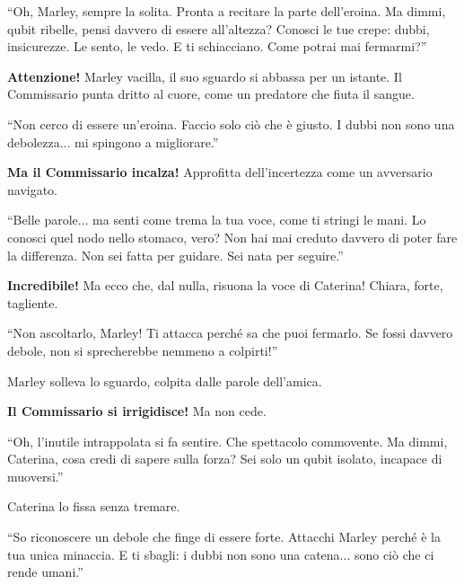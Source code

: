 \begin{dialogue}  \enquote{Oh, Marley, sempre la solita. Pronta a recitare la parte dell’eroina. Ma dimmi, qubit ribelle, pensi davvero di essere all’altezza? Conosci le tue crepe: dubbi, insicurezze. Le sento, le vedo. E ti schiacciano. Come potrai mai fermarmi?} \end{dialogue}

\textbf{Attenzione!} Marley vacilla, il suo sguardo si abbassa per un istante. Il Commissario punta dritto al cuore, come un predatore che fiuta il sangue.

\begin{dialogue}  \enquote{Non cerco di essere un’eroina. Faccio solo ciò che è giusto. I dubbi non sono una debolezza... mi spingono a migliorare.} \end{dialogue}

\textbf{Ma il Commissario incalza!} Approfitta dell’incertezza come un avversario navigato.

\begin{dialogue}  \enquote{Belle parole... ma senti come trema la tua voce, come ti stringi le mani. Lo conosci quel nodo nello stomaco, vero? Non hai mai creduto davvero di poter fare la differenza. Non sei fatta per guidare. Sei nata per seguire.} \end{dialogue}

\textbf{Incredibile!} Ma ecco che, dal nulla, risuona la voce di Caterina! Chiara, forte, tagliente.

\begin{dialogue}  \enquote{Non ascoltarlo, Marley! Ti attacca perché sa che puoi fermarlo. Se fossi davvero debole, non si sprecherebbe nemmeno a colpirti!} \end{dialogue}

Marley solleva lo sguardo, colpita dalle parole dell’amica.

\textbf{Il Commissario si irrigidisce!} Ma non cede.

\begin{dialogue}  \enquote{Oh, l’inutile intrappolata si fa sentire. Che spettacolo commovente. Ma dimmi, Caterina, cosa credi di sapere sulla forza? Sei solo un qubit isolato, incapace di muoversi.} \end{dialogue}

Caterina lo fissa senza tremare.

\begin{dialogue}  \enquote{So riconoscere un debole che finge di essere forte. Attacchi Marley perché è la tua unica minaccia. E ti sbagli: i dubbi non sono una catena... sono ciò che ci rende umani.} \end{dialogue}

